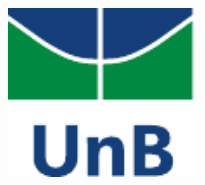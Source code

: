 \begin{titlepage}

\includegraphics[width=5cm,height=5cm,keepaspectratio]{img/unb_vert.pdf}\\[1cm] %
 

\vfill %

\end{titlepage}

